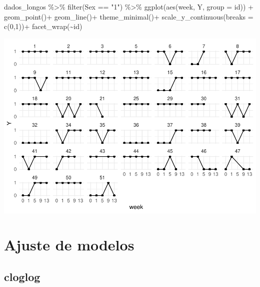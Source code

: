 \documentclass[
]{article}
\newenvironment{Shaded}{\begin{snugshade}}{\end{snugshade}}
\newcommand{\AttributeTok}[1]{\textcolor[rgb]{0.77,0.63,0.00}{#1}}
\newcommand{\DecValTok}[1]{\textcolor[rgb]{0.00,0.00,0.81}{#1}}
\newcommand{\FunctionTok}[1]{\textcolor[rgb]{0.00,0.00,0.00}{#1}}
\newcommand{\NormalTok}[1]{#1}
\newcommand{\OtherTok}[1]{\textcolor[rgb]{0.56,0.35,0.01}{#1}}
\newcommand{\SpecialCharTok}[1]{\textcolor[rgb]{0.00,0.00,0.00}{#1}}
\newcommand{\StringTok}[1]{\textcolor[rgb]{0.31,0.60,0.02}{#1}}
\begin{document}
\begin{Shaded}
\begin{Highlighting}[]
\NormalTok{dados\_longos }\SpecialCharTok{\%\textgreater{}\%} \FunctionTok{filter}\NormalTok{(Sex }\SpecialCharTok{==} \StringTok{"1"}\NormalTok{) }\SpecialCharTok{\%\textgreater{}\%}
  \FunctionTok{ggplot}\NormalTok{(}\FunctionTok{aes}\NormalTok{(week, Y, }\AttributeTok{group =}\NormalTok{ id)) }\SpecialCharTok{+}
  \FunctionTok{geom\_point}\NormalTok{()}\SpecialCharTok{+}
  \FunctionTok{geom\_line}\NormalTok{()}\SpecialCharTok{+}
  \FunctionTok{theme\_minimal}\NormalTok{()}\SpecialCharTok{+}
  \FunctionTok{scale\_y\_continuous}\NormalTok{(}\AttributeTok{breaks =} \FunctionTok{c}\NormalTok{(}\DecValTok{0}\NormalTok{,}\DecValTok{1}\NormalTok{))}\SpecialCharTok{+}
  \FunctionTok{facet\_wrap}\NormalTok{(}\SpecialCharTok{\textasciitilde{}}\NormalTok{id)}
\end{Highlighting}
\end{Shaded}

\includegraphics{EDA__files/figure-latex/unnamed-chunk-8-1.pdf}

\hypertarget{ajuste-de-modelos}{%
\section{Ajuste de modelos}\label{ajuste-de-modelos}}

\hypertarget{cloglog}{%
\subsection{cloglog}\label{cloglog}}

\begin{Shaded}
\end{Shaded}
\end{document}
